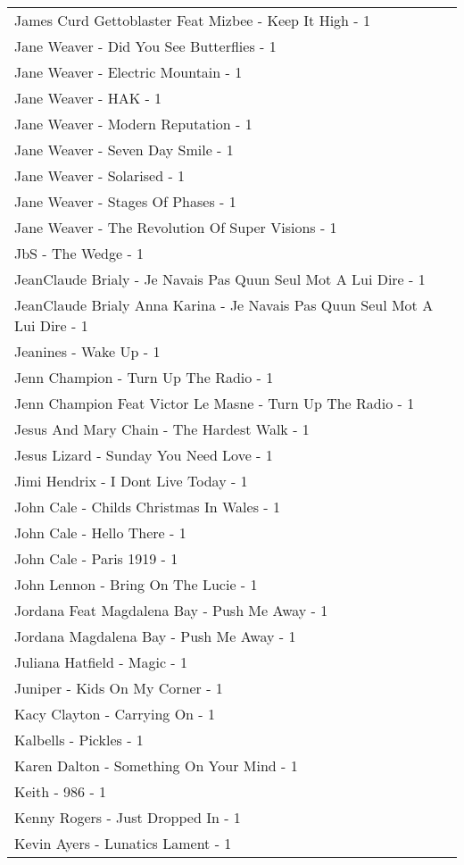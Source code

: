 \documentclass[
]{article}
\begin{document}
\begin{longtable}{l}
James Curd Gettoblaster Feat Mizbee - Keep It High - 1 \\ 
Jane Weaver - Did You See Butterflies - 1 \\ 
Jane Weaver - Electric Mountain - 1 \\ 
Jane Weaver - HAK - 1 \\ 
Jane Weaver - Modern Reputation - 1 \\ 
Jane Weaver - Seven Day Smile - 1 \\ 
Jane Weaver - Solarised - 1 \\ 
Jane Weaver - Stages Of Phases - 1 \\ 
Jane Weaver - The Revolution Of Super Visions - 1 \\ 
JbS - The Wedge - 1 \\ 
JeanClaude Brialy - Je Navais Pas Quun Seul Mot A Lui Dire - 1 \\ 
JeanClaude Brialy Anna Karina - Je Navais Pas Quun Seul Mot A Lui Dire - 1 \\ 
Jeanines - Wake Up - 1 \\ 
Jenn Champion - Turn Up The Radio - 1 \\ 
Jenn Champion Feat Victor Le Masne - Turn Up The Radio - 1 \\ 
Jesus And Mary Chain - The Hardest Walk - 1 \\ 
Jesus Lizard - Sunday You Need Love - 1 \\ 
Jimi Hendrix - I Dont Live Today - 1 \\ 
John Cale - Childs Christmas In Wales - 1 \\ 
John Cale - Hello There - 1 \\ 
John Cale - Paris 1919 - 1 \\ 
John Lennon - Bring On The Lucie - 1 \\ 
Jordana Feat Magdalena Bay - Push Me Away - 1 \\ 
Jordana Magdalena Bay - Push Me Away - 1 \\ 
Juliana Hatfield - Magic - 1 \\ 
Juniper - Kids On My Corner - 1 \\ 
Kacy Clayton - Carrying On - 1 \\ 
Kalbells - Pickles - 1 \\ 
Karen Dalton - Something On Your Mind - 1 \\ 
Keith - 986 - 1 \\ 
Kenny Rogers - Just Dropped In - 1 \\ 
Kevin Ayers - Lunatics Lament - 1 \\ 

\end{longtable}
\end{document}
